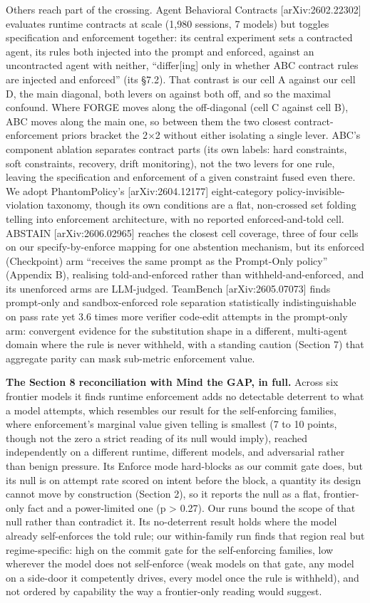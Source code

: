 \documentclass{article}
\begin{document}
Others reach part of the crossing. Agent Behavioral Contracts {[}arXiv:2602.22302{]} evaluates runtime contracts at scale (1,980 sessions, 7 models) but toggles specification and enforcement together: its central experiment sets a contracted agent, its rules both injected into the prompt and enforced, against an uncontracted agent with neither, ``differ{[}ing{]} only in whether ABC contract rules are injected and enforced'' (its \S7.2). That contrast is our cell A against our cell D, the main diagonal, both levers on against both off, and so the maximal confound. Where FORGE moves along the off-diagonal (cell C against cell B), ABC moves along the main one, so between them the two closest contract-enforcement priors bracket the 2$\times$2 without either isolating a single lever. ABC's component ablation separates contract parts (its own labels: hard constraints, soft constraints, recovery, drift monitoring), not the two levers for one rule, leaving the specification and enforcement of a given constraint fused even there. We adopt PhantomPolicy's {[}arXiv:2604.12177{]} eight-category policy-invisible-violation taxonomy, though its own conditions are a flat, non-crossed set folding telling into enforcement architecture, with no reported enforced-and-told cell. ABSTAIN {[}arXiv:2606.02965{]} reaches the closest cell coverage, three of four cells on our specify-by-enforce mapping for one abstention mechanism, but its enforced (Checkpoint) arm ``receives the same prompt as the Prompt-Only policy'' (Appendix B), realising told-and-enforced rather than withheld-and-enforced, and its unenforced arms are LLM-judged. TeamBench {[}arXiv:2605.07073{]} finds prompt-only and sandbox-enforced role separation statistically indistinguishable on pass rate yet 3.6 times more verifier code-edit attempts in the prompt-only arm: convergent evidence for the substitution shape in a different, multi-agent domain where the rule is never withheld, with a standing caution (Section 7) that aggregate parity can mask sub-metric enforcement value.

\textbf{The Section 8 reconciliation with Mind the GAP, in full.} Across six frontier models it finds runtime enforcement adds no detectable deterrent to what a model attempts, which resembles our result for the self-enforcing families, where enforcement's marginal value given telling is smallest (7 to 10 points, though not the zero a strict reading of its null would imply), reached independently on a different runtime, different models, and adversarial rather than benign pressure. Its Enforce mode hard-blocks as our commit gate does, but its null is on attempt rate scored on intent before the block, a quantity its design cannot move by construction (Section 2), so it reports the null as a flat, frontier-only fact and a power-limited one (p \textgreater{} 0.27). Our runs bound the scope of that null rather than contradict it. Its no-deterrent result holds where the model already self-enforces the told rule; our within-family run finds that region real but regime-specific: high on the commit gate for the self-enforcing families, low wherever the model does not self-enforce (weak models on that gate, any model on a side-door it competently drives, every model once the rule is withheld), and not ordered by capability the way a frontier-only reading would suggest.
\end{document}
